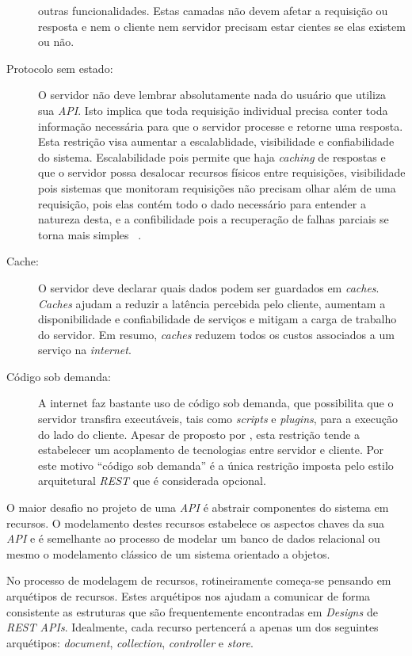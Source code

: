 \begin{description}
  outras funcionalidades. Estas camadas não devem afetar a requisição ou resposta e nem o cliente 
  nem servidor precisam estar cientes se elas existem ou não.
\item[Protocolo sem estado:] O servidor não deve lembrar absolutamente nada do usuário que 
  utiliza sua \emph{API}. Isto implica que toda requisição individual precisa conter toda 
  informação necessária para que o servidor processe e retorne uma resposta. Esta restrição 
  visa aumentar a escalablidade, visibilidade e confiabilidade do sistema. Escalabilidade pois 
  permite que haja \emph{caching} de respostas e que o servidor possa desalocar recursos 
  físicos entre requisições, visibilidade pois sistemas que monitoram requisições não 
  precisam olhar além de uma requisição, pois elas contém todo o dado necessário 
  para entender a natureza desta, e a confibilidade pois a recuperação de falhas 
  parciais se torna mais simples \ \cite{kendall1994note}.
\item[Cache:] O servidor deve declarar quais dados podem ser guardados em \emph{caches}. 
  \emph{Caches} ajudam a reduzir a latência percebida pelo cliente, aumentam a disponibilidade 
  e confiabilidade de serviços e mitigam a carga de trabalho do servidor. Em resumo, 
  \emph{caches} reduzem todos os custos associados a um serviço na \emph{internet}.
\item[Código sob demanda:] A internet faz bastante uso de código sob demanda, que possibilita 
  que o servidor transfira executáveis, tais como \emph{scripts} e \emph{plugins}, para a 
  execução do lado do cliente. Apesar de proposto por , 
  esta restrição tende a estabelecer um acoplamento de tecnologias entre servidor e cliente. 
  Por este motivo ``código sob demanda'' é a única restrição imposta pelo estilo arquitetural 
  \emph{REST} que é considerada opcional.
\end{description}

O maior desafio no projeto de uma \emph{API} é abstrair componentes do sistema
em recursos. O modelamento destes recursos estabelece os aspectos chaves da sua \emph{API}
e é semelhante ao processo de modelar um banco de dados relacional ou mesmo o modelamento 
clássico de um sistema orientado a objetos.

No processo de modelagem de recursos, rotineiramente começa-se pensando em arquétipos de 
recursos. Estes arquétipos nos ajudam a  comunicar de forma consistente 
as estruturas que são frequentemente encontradas em \emph{Designs} de \emph{REST APIs}.
Idealmente, cada recurso pertencerá a apenas um dos seguintes arquétipos: \emph{document}, 
\emph{collection}, \emph{controller} e \emph{store}.


